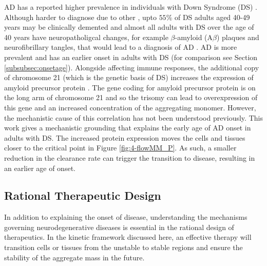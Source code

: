 AD has a reported higher prevalence in individuals with Down Syndrome (DS) \cite{head_aging_2012, zigman_alzheimers_2007}. Although harder to diagnose due to other , upto $55\%$ of DS adults aged 40-49 years may be clinically demented and almost all adults with DS over the age of 40 years have neuropatholigcal changes, for example $\beta$-amyloid (A$\beta$)  plaques and neurofibrillary tangles, that would lead to a diagnosis of AD \cite{zigman_alzheimers_2007}. AD is more prevalent and has an earlier onset in adults with DS (for comparison see Section \ref{subsubsec:onsetage}). Alongside affecting immune responses, the additional copy of chromosome 21 (which is the genetic basis of DS) increases the expression of amyloid precursor protein \cite{head_aging_2012, rumble_amyloid_1989}. The gene coding for amyloid precursor protein is on the long arm of chromosome 21 and so the trisomy can lead to overexpression of this gene and an increased concentration of the aggregating monomer. However, the mechanistic cause of this correlation has not been understood previously. This work gives a mechanistic grounding that explains the early age of AD onset in adults with DS. The increased protein expression moves the cells and tissues closer to the critical point  in Figure \ref{fig:4-flowMM_P}. As such, a smaller reduction in the clearance rate can trigger the transition to disease, resulting in an earlier age of onset.

\subsection{Rational Therapeutic Design}


In addition to explaining the onset of disease, understanding the mechanisms governing neurodegenerative diseases is essential in the rational design of therapeutics. In the kinetic framework discussed here, an effective therapy will transition cells or tissues from the unstable to stable regions and ensure the stability of the aggregate mass in the future.

